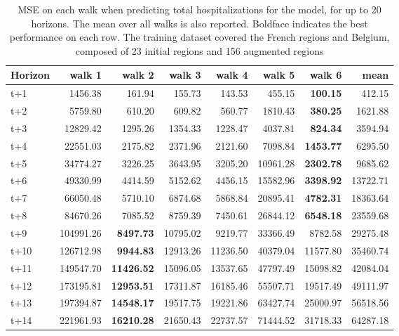 \begin{table}[H]
\centering
\caption{MSE on each walk when predicting total hospitalizations for the model, for up to 20 horizons. The mean over all walks is also reported. Boldface indicates the best performance on each row. The training dataset covered the French regions and Belgium, composed of 23 initial regions and 156 augmented regions }
\label{tab:MSE_walk_baseline}
\begin{tabular}{lrrrrrrr}
\toprule
Horizon &    walk 1 &   walk 2 &   walk 3 &   walk 4 &    walk 5 &    walk 6 &      mean \\
\midrule
t+1  & 1456.38  & 161.94  & 155.73  & 143.53  & 455.15  & \textbf{100.15}  & 412.15  \\
t+2  & 5759.80  & 610.20  & 609.82  & 560.77  & 1810.43  & \textbf{380.25}  & 1621.88  \\
t+3  & 12829.42  & 1295.26  & 1354.33  & 1228.47  & 4037.81  & \textbf{824.34}  & 3594.94  \\
t+4  & 22551.03  & 2175.82  & 2371.96  & 2121.60  & 7098.84  & \textbf{1453.77}  & 6295.50  \\
t+5  & 34774.27  & 3226.25  & 3643.95  & 3205.20  & 10961.28  & \textbf{2302.78}  & 9685.62  \\
t+6  & 49330.99  & 4414.59  & 5152.62  & 4456.15  & 15582.96  & \textbf{3398.92}  & 13722.71  \\
t+7  & 66050.48  & 5710.10  & 6874.68  & 5868.84  & 20895.41  & \textbf{4782.31}  & 18363.64  \\
t+8  & 84670.26  & 7085.52  & 8759.39  & 7450.61  & 26844.12  & \textbf{6548.18}  & 23559.68  \\
t+9  & 104991.26  & \textbf{8497.73}  & 10795.02  & 9219.77  & 33366.49  & 8782.58  & 29275.48  \\
t+10  & 126712.98  & \textbf{9944.83}  & 12913.26  & 11236.50  & 40379.04  & 11577.80  & 35460.74  \\
t+11  & 149547.70  & \textbf{11426.52}  & 15096.05  & 13537.65  & 47797.49  & 15098.82  & 42084.04  \\
t+12  & 173195.81  & \textbf{12953.51}  & 17311.87  & 16185.46  & 55507.71  & 19517.49  & 49111.97  \\
t+13  & 197394.87  & \textbf{14548.17}  & 19517.75  & 19221.86  & 63427.74  & 25000.97  & 56518.56  \\
t+14  & 221961.93  & \textbf{16210.28}  & 21650.43  & 22737.57  & 71444.52  & 31718.33  & 64287.18  \\

\end{tabular}
\end{table}
